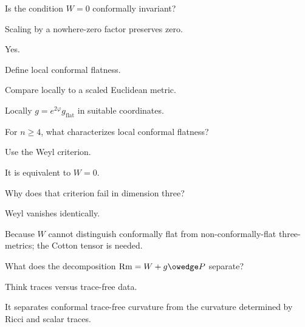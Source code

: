 \begin{exercise}\label{exr:vii28-17}
Is the condition \(W=0\) conformally invariant?
\end{exercise}
\begin{hint}
Scaling by a nowhere-zero factor preserves zero.
\end{hint}
\begin{solution}
Yes.
\end{solution}

\begin{exercise}\label{exr:vii28-18}
Define local conformal flatness.
\end{exercise}
\begin{hint}
Compare locally to a scaled Euclidean metric.
\end{hint}
\begin{solution}
Locally \(g=e^{2\varphi}g_{\mathrm{flat}}\) in suitable coordinates.
\end{solution}

\begin{exercise}\label{exr:vii28-19}
For \(n\ge4\), what characterizes local conformal flatness?
\end{exercise}
\begin{hint}
Use the Weyl criterion.
\end{hint}
\begin{solution}
It is equivalent to \(W=0\).
\end{solution}

\begin{exercise}\label{exr:vii28-20}
Why does that criterion fail in dimension three?
\end{exercise}
\begin{hint}
Weyl vanishes identically.
\end{hint}
\begin{solution}
Because \(W\) cannot distinguish conformally flat from non-conformally-flat three-metrics; the Cotton tensor is needed.
\end{solution}

\begin{exercise}\label{exr:vii28-21}
What does the decomposition \(\operatorname{Rm}=W+g\owedge P\) separate?
\end{exercise}
\begin{hint}
Think traces versus trace-free data.
\end{hint}
\begin{solution}
It separates conformal trace-free curvature from the curvature determined by Ricci and scalar traces.
\end{solution}

